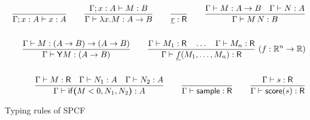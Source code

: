 \begin{figure*}[h]
\begin{align*}
  \frac{}{\Gamma ; x:A \vdash x:A} 
  \qquad
  \frac{\Gamma ; x:A \vdash M : B}{\Gamma \vdash \lambda x.M : A \to B} 
  \qquad
  \frac{}{\underline{r} : \textsf{R}} 
  \qquad
  \frac{\Gamma \vdash M:A \to B \quad \Gamma \vdash N : A}{\Gamma \vdash M \, N : B} 
  \\ \\
  \qquad
  \frac{\Gamma \vdash M : (A \to B) \to (A \to B)}{\Gamma \vdash \mathsf{Y} M : (A \to B)}
  \qquad
  \frac{\Gamma \vdash M_1:\textsf{R} \quad \dots \quad \Gamma \vdash M_n:\textsf{R}}{\Gamma \vdash \underline{f}(M_1,\dots,M_n) : \textsf{R}} \ (f : \mathbb{R}^n \to \mathbb{R})    
  \\ \\
  \qquad
  \frac{\Gamma \vdash M : \textsf{R} \quad \Gamma \vdash N_1 : A \quad \Gamma \vdash N_2 : A}{\Gamma \vdash \mathsf{if}\boldsymbol{(}M < 0, N_1, N_2\boldsymbol{)} : A}
  \qquad
  \frac{}{\Gamma \vdash \mathsf{sample} : \textsf{R}} 
  \qquad
  \frac{\Gamma \vdash s : \textsf{R}}{\Gamma \vdash \mathsf{score} (s) : \textsf{R}}
\end{align*}
\caption{Typing rules of SPCF \label{fig:typing rules}}
\end{figure*}

